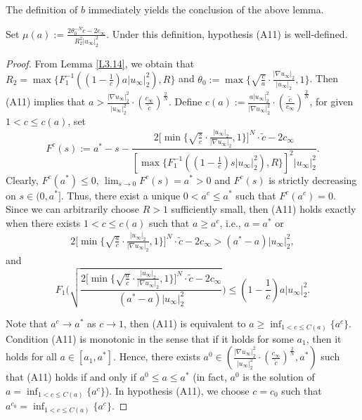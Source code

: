 \documentclass[reqno]{amsart}
\begin{document}
The definition of $b$ immediately yields the conclusion of the above lemma.

\begin{lemma}\label{L3.17} 
Set $\mu(a):=\frac{2\theta^{-N}_0\tilde{c}-2c_\infty}{R^2_2|u_\infty|^2_2}$. 
Under this definition, hypothesis {\rm (A11)} is well-defined.
\end{lemma}

\begin{proof}
From Lemma \ref{L3.14}, we obtain that  
$R_2=\max\{F_1^{-1}((1-\frac{1}{c})a|u_\infty|^2_2), R\}$ and 
$\theta_0:=\max\{\sqrt{\frac{c}{a}}\cdot\frac{|\nabla u_\infty|_2}{|u_\infty|_2},1\}$.
Then (A11) implies that 
$a> \frac{|\nabla u_\infty|^2_2}{|u_\infty|^2_2}\cdot(\frac{c_\infty}{\tilde{c}})^{\frac{2}{N}}$. 
Define $c(a):=\frac{a| u_\infty|^2_2}{|\nabla u_\infty|^2_2}
\cdot(\frac{\tilde{c}}{c_\infty})^{\frac{2}{N}}$, 
for given $1<c\leq c(a)$, set
$$
F^c(s):=a^*-s-\frac{2{[\min\{\sqrt{\frac{s}{c}}\cdot\frac{| u_\infty|_2}{|\nabla u_\infty|_2},1\}}]^N\cdot\tilde{c}-2c_\infty}{[\max\{F_1^{-1}((1-\frac{1}{c})s|u_\infty|^2_2),R\}]^2
|u_\infty|^2_2}.
$$
Clearly, $F^c(a^*)\leq0$, $\lim_{s\to0}F^c(s)=a^*>0$ and $F^c(s)$ is strictly decreasing 
on $s\in(0,a^*]$. Thus, there exist a unique $0<a^c\leq a^*$ such that $F^c(a^c)=0$. 
Since we can arbitrarily  choose $R>1$ sufficiently
small, then (A11) holds exactly when there exists $1<c\leq c(a)$ such that 
$a\geq a^c$, i.e., $ a=a^*$ or 
\begin{align*} 
2{[\min\{\sqrt{\frac{a}{c}}\cdot\frac{| u_\infty|_2}{|\nabla u_\infty|_2},1\}}]^N\cdot\tilde{c}-2c_\infty>(a^*-a)|u_\infty|^2_2,
\end{align*} 
and 
$$
F_1\bigg(\sqrt{\frac{2{[\min\{\sqrt{\frac{a}{c}}\cdot\frac{| u_\infty|_2}{|\nabla u_\infty|_2},1\}}]^N\cdot\tilde{c}-2c_\infty}{(a^*-a)|u_\infty|^2_2}}\bigg)\leq(1-\frac{1}{c})a|u_\infty|^2_2.
$$

Note that $a^c\to a^*$ as $c\to1$, then (A11) is equivalent to $a\geq \inf_{1<c\leq C(a)}\{a^c\}$. 
Condition (A11) is monotonic in the sense that if it holds for some $a_1$, then it holds for all $a\in[a_1, a^*]$. Hence, there exists 
$a^0\in(\frac{|\nabla u_\infty|^2_2}{|u_\infty|^2_2}\cdot(\frac{c_\infty}{\tilde{c}})^{\frac{2}{N}}, a^*)$ 
such that (A11) holds if and only if $a^0\leq a\leq a^*$ (in fact, $a^0$ is the solution of 
$a=\inf_{1<c\leq C(a)}\{a^c\}$). In hypothesis (A11), we  choose $c=c_0$ such that 
$a^{c_0}=\inf_{1<c\leq C(a)}\{a^c\}$.
\end{proof}
\end{document}
